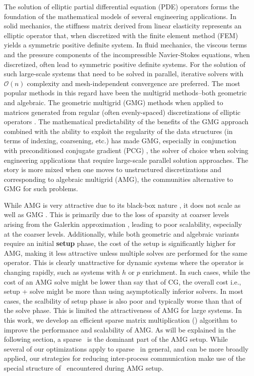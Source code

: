 
The solution of elliptic partial differential equation (PDE) operators forms the 
foundation of the mathematical models of several engineering applications.
In solid mechanics, the stiffness matrix derived from linear elasticity represents an elliptic
operator that, when discretized with the finite element method (FEM) yields a symmetric positive
definite system. In fluid mechanics, the viscous terms and the pressure components of
the incompressible Navier-Stokes equations, when discretized, often lead to symmetric
positive definite systems. 
For the solution of such large-scale systems that need to be solved in parallel, iterative solvers 
with $\mathcal{O}(n)$ complexity and mesh-independent convergence are preferred. 
%
The most popular methods in this regard have been the multigrid methods--both geometric and algebraic. 
The geometric multigrid (GMG) methods when applied
to matrices generated from regular (often evenly-spaced) discretizations of elliptic operators \cite{MadayMunoz88,BrambleZhang00,Brenner02,GholamiMalhotraSundar2016}.
The mathematical predictability of the benefits of the GMG approach combined with the ability to
exploit the regularity of the data structures (in terms of indexing, coarsening, etc.) has made
GMG, especially in conjunction with preconditioned conjugate gradient (PCG) \cite{Braess86,TatebeOyanagi94}, the solver of choice when solving engineering applications that require large-scale
parallel solution approaches.  The story is more mixed when one moves to unstructured discretizations
and corresponding to algebraic multigrid (AMG), the communities alternative to GMG for such problems.  

While AMG is very attractive due to its black-box nature \cite{Dendy82,Vanek:1995,VanekBrezinaMandelEtAl01}, it does not scale as well as GMG \cite{Sundar12}. This is primarily due to
the loss of sparsity at coarser levels arising from the Galerkin approximation \cite{treister2015non}, leading to poor scalability, especially at the coarser levels.
Additionally, while both geometric and algebraic variants require an initial {\bf setup} phase, the cost of the setup is significantly higher for AMG, making it less attractive unless multiple solves are performed for the same operator. This is clearly unattractive for dynamic systems where the operator is changing rapidly, such as systems with $h$ or $p$ enrichment. In such cases, while the cost of an AMG solve might be lower than say that of CG, the overall cost i.e., setup + solve might be more than using asymptotically inferior solvers. In most cases, the scalbility of 
setup phase is also poor and typically worse than that of the solve phase. This is limited the attractiveness of AMG for large systems. In this work, we develop an efficient sparse matrix multiplication (\mm) algorithm to improve the performance and scalability of AMG. As will be explained in the following section, a sparse \mm\ is the dominant part of the AMG setup. While several of our optimizations apply to sparse \mm\ in general, and can be more broadly applied, our strategies for reducing inter-process communication make use of the special structure of \mm\ encountered during AMG setup.


